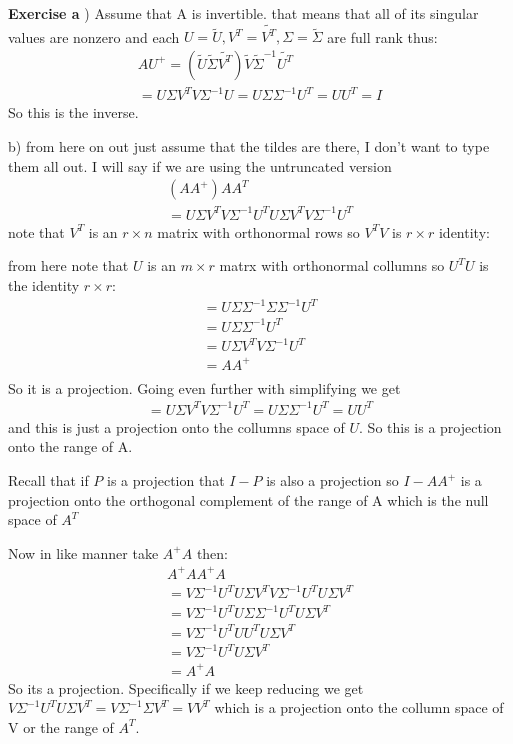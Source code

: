 \documentclass[12pt]{article}
\newenvironment{exercise}[1]{\vspace{.1in}\noindent\textbf{Exercise #1 \hspace{.05em}}}{}
\theoremstyle{definition}
\theoremstyle{remark}
\begin{document}
\begin{exercise}{5}

	a) Assume that A is invertible. that means that all of its singular values are nonzero and each $U= \tilde{U},V^T= \tilde{V^T},\Sigma= \tilde{\Sigma}$ are full rank thus:
	\begin{align}
		AU^+=( \tilde{U} \tilde{\Sigma} \tilde{V^T}) \tilde{V} \tilde{\Sigma}^{-1} \tilde{U^T} \\
		=U\Sigma V^TV\Sigma^{-1}U=U\Sigma \Sigma^{-1}U^T=UU^T=I
	\end{align}
	So this is the inverse.

	b) from here on out just assume that the tildes are there, I don't want to type them all out. I will say if we are using the untruncated version
	\begin{align}
		(AA^+)AA^T \\
		=U\Sigma V^T V\Sigma^{-1}U^TU\Sigma V^TV\Sigma^{-1}U^T
	\end{align}
	note that $V^T$ is an $r\times n$ matrix with orthonormal rows so $V^TV$ is $r\times r$ identity:

	from here note that $U$ is an $m\times r$ matrx with orthonormal collumns so $U^TU$ is the identity $r\times r$:
	\begin{align}
		=U\Sigma \Sigma^{-1}\Sigma\Sigma^{-1}U^T \\
		=U\Sigma \Sigma^{-1}U^T                  \\
		=U\Sigma V^TV\Sigma^{-1}U^T              \\
		=AA^+                                    \\
	\end{align}
	So it is a projection. Going even further with simplifying we get
	\begin{align}
		=U\Sigma V^TV\Sigma^{-1}U^T
		=U\Sigma \Sigma^{-1}U^T
		=UU^T
	\end{align}
	and this is just a projection onto the collumns space of $U$. So this is a projection onto the range of A.

	Recall that if $P$ is a projection that $I-P$ is also a projection so $I-AA^+$ is a projection onto the orthogonal complement of the range of A which is the null space of $A^T$

	Now in like manner take $A^+A$ then:
	\begin{align}
		A^+AA^+A                                              \\
		=V\Sigma^{-1}U^TU\Sigma V^TV\Sigma^{-1}U^TU\Sigma V^T \\
		=V\Sigma^{-1}U^TU\Sigma \Sigma^{-1}U^TU\Sigma V^T     \\
		=V\Sigma^{-1}U^TUU^TU\Sigma V^T                       \\
		=V\Sigma^{-1}U^TU\Sigma V^T                           \\
		=A^+A
	\end{align}
	So its a projection. Specifically if we keep reducing we get $V\Sigma^{-1}U^TU\Sigma V^T=V\Sigma^{-1}\Sigma V^T=VV^T$ which is a projection onto the collumn space of V or the range of $A^T$.


\end{exercise}
\end{document}
